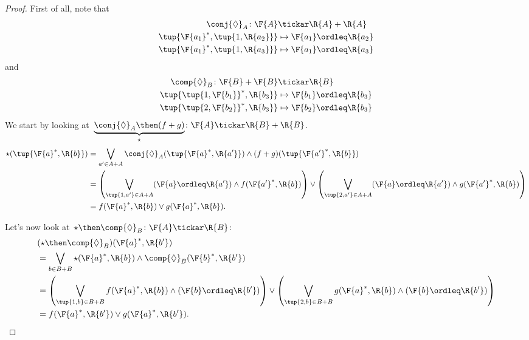 \begin{proof}
First of all, note that 
\begin{equation}
    \begin{aligned}
    \conj{\Diamond}_A\colon \F{A}&\tickar \R{A}+\R{A}\\
    \tup{\F{a_1}^*,\tup{1,\R{a_2}}}&\mapsto \F{a_1}\ordleq \R{a_2}\\
    \tup{\F{a_1}^*,\tup{1,\R{a_3}}}&\mapsto \F{a_1}\ordleq \R{a_3}
    \end{aligned}
\end{equation}
and
\begin{equation}
    \begin{aligned}
    \comp{\Diamond}_B\colon \F{B}+\F{B}&\tickar \R{B}\\
    \tup{\tup{1,\F{b_1}}^*,\R{b_3}}&\mapsto \F{b_1}\ordleq \R{b_3}\\
    \tup{\tup{2,\F{b_2}}^*,\R{b_3}}&\mapsto \F{b_2}\ordleq \R{b_3}
    \end{aligned}
\end{equation}
We start by looking at~$\underbrace{\conj{\Diamond}_A\then (f+g)}_{\star}\colon \F{A} \tickar \R{B}+\R{B}$. 
\begin{equation}
    \begin{aligned}
    \star (\tup{\F{a}^*,\R{b}})&=\bigvee_{a'\in A+A} \conj{\Diamond}_A(\tup{\F{a}^*,\R{a'}})\wedge (f+g)(\tup{\F{a'}^*,\R{b}})\\
    &=\left( \bigvee_{\tup{1,a'}\in A+A} (\F{a}\ordleq \R{a'})\wedge f(\F{a'}^*,\R{b}) \right)\vee \left( \bigvee_{\tup{2,a'}\in A+A} (\F{a}\ordleq \R{a'})\wedge g(\F{a'}^*,\R{b}) \right)\\
    &=f(\F{a}^*,\R{b}) \vee g(\F{a}^*,\R{b}).
    \end{aligned}
\end{equation}

Let's now look at~$\star \then \comp{\Diamond}_B\colon \F{A} \tickar \R{B}$:
\begin{equation}
    \begin{aligned}
    &(\star \then \comp{\Diamond}_B)(\F{a}^*,\R{b'})\\
    &=\bigvee_{b\in B+B} \star(\F{a}^*,\R{b})\wedge \comp{\Diamond}_B(\F{b}^*,\R{b'}) \\
    &=\left(\bigvee_{\tup{1,b}\in B+B} f(\F{a}^*,\R{b}) \wedge (\F{b}\ordleq \R{b'})\right) \vee 
    \left(\bigvee_{\tup{2,b}\in B+B} g(\F{a}^*,\R{b}) \wedge (\F{b}\ordleq \R{b'})\right)\\
    &=f(\F{a}^*,\R{b'})\vee g(\F{a}^*,\R{b'}).
    \end{aligned}
\end{equation}
\end{proof}

